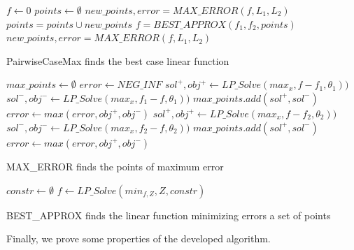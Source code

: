 \begin{algorithm}[!ht]
\dontprintsemicolon
{}
$f \gets 0$\;
$points \gets \emptyset$\;
$new\_points, error = MAX\_ERROR(f, L_1,L_2)$\;
 {
	$points = points \cup new\_points$\;
	$f = BEST\_APPROX(f_1,f_2,points)$\;
	$new\_points, error = MAX\_ERROR(f, L_1,L_2)$\;}
\;
\caption{{\sc PairwiseCaseMax} finds the best case linear function}
\label{alg:glo}
\end{algorithm}

\begin{algorithm}[!ht]
\dontprintsemicolon
{}
$max\_points \gets \emptyset$\;
$error \gets NEG\_INF$\;
 {
	$sol^+, obj^+ \gets LP\_Solve(max _x, f-f_1,\theta_1) )$\;
	$sol^-, obj^- \gets LP\_Solve(max _x, f_1-f,\theta_1) )$\;
	$max\_points.add(sol^+,sol^-)$\; 	$error \gets max(error, obj^+, obj^-)$\; 
	}
 {
	$sol^+, obj^+ \gets LP\_Solve(max _x, f-f_2,\theta_2) )$\;
	$sol^-, obj^- \gets LP\_Solve(max _x, f_2-f,\theta_2) )$\;
	$max\_points.add(sol^+,sol^-)$\; 	$error \gets max(error, obj^+, obj^-)$\; 
	}\;
\caption{{\sc MAX\_ERROR} finds the points of maximum error}
\label{alg:maxError}
\end{algorithm}


\begin{algorithm}[!ht]
\dontprintsemicolon
{}
$constr \gets \emptyset$\;
\;
$f \gets LP\_Solve(min_{f,Z}, Z, constr)$\;	
\;
\caption{{\sc BEST\_APPROX} finds the linear function minimizing errors a set of points}
\label{alg:relaxApprox}
\end{algorithm}

Finally, we prove some properties of the developed algorithm.

